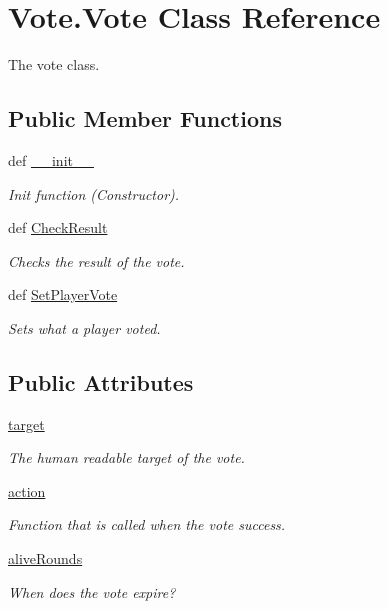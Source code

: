 \hypertarget{class_vote_1_1_vote}{
\section{Vote.Vote Class Reference}
\label{class_vote_1_1_vote}
}


The vote class.  


\subsection*{Public Member Functions}
\begin{DoxyCompactItemize}
\item 
def \hyperlink{class_vote_1_1_vote_a21a4fb73105ec2d18322bb9c9776a800}{\_\-\_\-init\_\-\_\-}
\begin{DoxyCompactList}\small\item\em Init function (Constructor). \item\end{DoxyCompactList}\item 
def \hyperlink{class_vote_1_1_vote_acda3525e83e91d9e4622218635f92d4b}{CheckResult}
\begin{DoxyCompactList}\small\item\em Checks the result of the vote. \item\end{DoxyCompactList}\item 
def \hyperlink{class_vote_1_1_vote_aaf3a60226df03a3f737c2e0f7ea37d4d}{SetPlayerVote}
\begin{DoxyCompactList}\small\item\em Sets what a player voted. \item\end{DoxyCompactList}\end{DoxyCompactItemize}
\subsection*{Public Attributes}
\begin{DoxyCompactItemize}
\item 
\hyperlink{class_vote_1_1_vote_afe0be7a3c2d7d0439a478b1ef0b30ed6}{target}
\begin{DoxyCompactList}\small\item\em The human readable target of the vote. \item\end{DoxyCompactList}\item 
\hyperlink{class_vote_1_1_vote_a7540d71a94e58d4a4877a8a949232fe3}{action}
\begin{DoxyCompactList}\small\item\em Function that is called when the vote success. \item\end{DoxyCompactList}\item 
\hyperlink{class_vote_1_1_vote_af6004cd9228253e93b618b769dbc8855}{aliveRounds}
\begin{DoxyCompactList}\small\item\em When does the vote expire? \item\end{DoxyCompactList}\end{DoxyCompactItemize}
